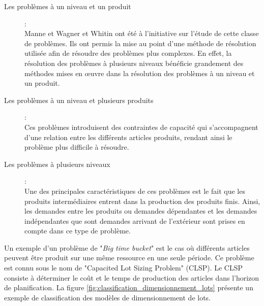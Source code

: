 	\begin{description}
		\item[Les problèmes à un niveau et un produit]: \\
		Manne \cite{manne} et Wagner et Whitin \cite{wagner_whitin} ont été à l'initiative sur l'étude de cette classe de problèmes. Ils ont permis la mise au point d'une méthode de résolution utilisée afin de résoudre des problèmes plus complexes. En effet, la résolution des problèmes à plusieurs niveaux bénéficie grandement des méthodes mises en œuvre dans la résolution des problèmes à un niveau et un produit.
				
		\item[Les problèmes à un niveau et plusieurs produits]: \\
		Ces problèmes introduisent des contraintes de capacité qui s'accompagnent d'une relation entre les différents articles produits, rendant ainsi le problème plus difficile à résoudre.
		
		\item[Les problèmes à plusieurs niveaux]: \\ 
		Une des principales caractéristiques de ces problèmes est le fait que les produits intermédiaires entrent dans la production des produits finis. Ainsi, les demandes entre les produits ou demandes dépendantes et les demandes indépendantes que sont demandes arrivant de l'extérieur sont prises en compte dans ce type de problème.
		
	\end{description}
	
	Un exemple d'un problème de "\emph{Big time bucket}" est le cas où différents articles peuvent être produit sur une même ressource en une seule période. Ce problème est connu sous le nom de "Capacited Lot Sizing Problem" (CLSP). Le CLSP consiste à déterminer le coût et le temps de production des articles dans l'horizon de planification. La figure \ref{fig:classification_dimensionnement_lots} présente un exemple de classification des modèles de dimensionnement de lots.
	
